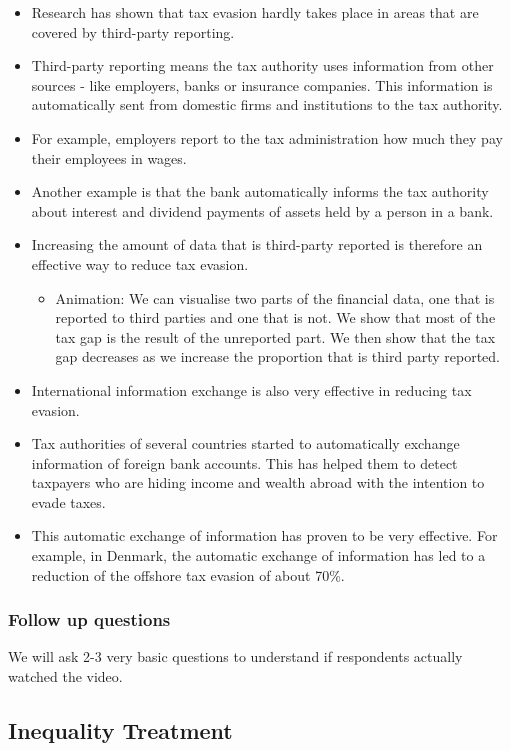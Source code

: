 \documentclass[11pt]{article}
\begin{document}
\begin{itemize}
\item Research has shown that tax evasion hardly takes place in areas that are covered by third-party reporting.
\item Third-party reporting means the tax authority uses information from other sources - like employers, banks or insurance companies. This information is automatically sent from domestic firms and institutions to the tax authority.
\item For example, employers report to the tax administration how much they pay their employees in wages.
\item Another example is that the bank automatically informs the tax authority about interest and dividend payments of assets held by a person in a bank.
\item Increasing the amount of data that is third-party reported is therefore an effective way to reduce tax evasion.
\begin{itemize}
    \item Animation: We can visualise two parts of the financial data, one that is reported to third parties and one that is not. We show that most of the tax gap is the result of the unreported part. We then show that the tax gap decreases as we increase the proportion that is third party reported.
\end{itemize}
\item International information exchange is also very effective in reducing tax evasion. %
\item Tax authorities of several countries started to automatically exchange information of foreign bank accounts. This has helped them to detect taxpayers who are hiding income and wealth abroad with the intention to evade taxes.
\item This automatic exchange of information has proven to be very effective. For example, in Denmark, the automatic exchange of information has led to a reduction of the offshore tax evasion of about 70\%. 

\end{itemize}
\subsubsection*{Follow up questions}
We will ask 2-3 very basic questions to understand if respondents actually watched the video.
\subsection{Inequality Treatment}
\end{document}
